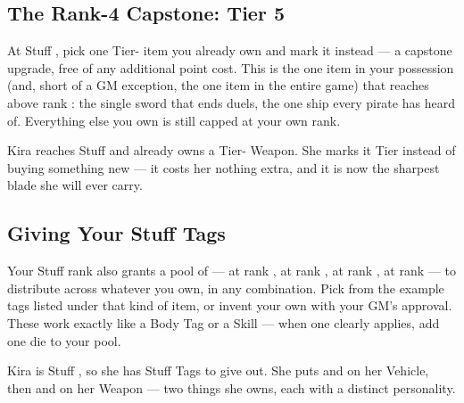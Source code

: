 \subsection*{The Rank-4 Capstone: Tier 5}
At Stuff , pick one Tier- item you already own and
mark it  instead --- a capstone upgrade, free of
any additional point cost. This is the one item in your possession (and,
short of a GM exception, the one item in the entire game) that reaches
above rank : the single sword that ends duels, the one ship
every pirate has heard of. Everything else you own is still capped at
your own rank.

\begin{example}
Kira reaches Stuff  and already owns a Tier- Weapon.
She marks it Tier  instead of buying something new --- it costs
her nothing extra, and it is now the sharpest blade she will ever carry.
\end{example}

\subsection*{Giving Your Stuff Tags}
Your Stuff rank also grants a pool of  --- 
at rank ,  at rank ,  at rank
,  at rank  --- to distribute across
whatever you own, in any combination. Pick from the example tags listed
under that kind of item, or invent your own with your GM's approval.
These work exactly like a Body Tag or a Skill --- when one clearly
applies, add one die to your pool.

\begin{example}
Kira is Stuff , so she has  Stuff Tags to give out. She
puts  and  on her Vehicle,
then  and  on her
Weapon --- two things she owns, each with a distinct personality.
\end{example}

